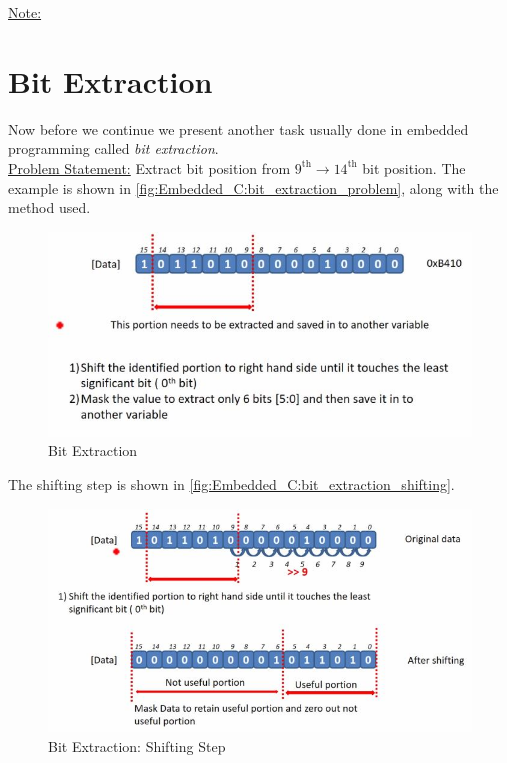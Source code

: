  \underline{Note:} 

\newpage
\section{Bit Extraction}
\label{Sec:Bit_Extraction}

Now before we continue we present another task usually done in embedded programming called \textit{bit extraction}.\\


\underline{Problem Statement:} Extract bit position from $9^{\mathrm{th}} \rightarrow 14^{\mathrm{th}}$ bit position. The example is shown in \autoref{fig:Embedded_C:bit_extraction_problem}, along with the method used.

\begin{figure}[h]
\centering
\includegraphics[scale=0.7]{Figures/Embedded_C/bit_extraction_problem}
\caption{Bit Extraction}
\label{fig:Embedded_C:bit_extraction_problem}
\end{figure}

The shifting step is shown in \autoref{fig:Embedded_C:bit_extraction_shifting}.

\begin{figure}[h]
\centering
\includegraphics[scale=0.7]{Figures/Embedded_C/bit_extraction_shifting}
\caption{Bit Extraction: Shifting Step}
\label{fig:Embedded_C:bit_extraction_shifting}
\end{figure}


